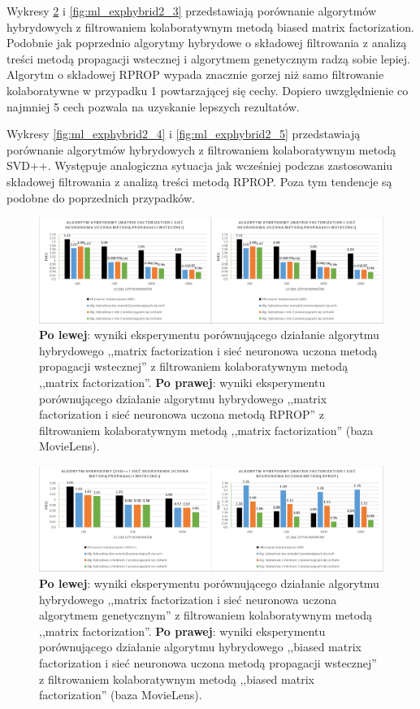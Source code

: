 \documentclass[twoside]{iisthesis}
\begin{document}
		Wykresy \ref{fig:ml_exphybrid2_2} i \ref{fig:ml_exphybrid2_3} przedstawiają porównanie algorytmów hybrydowych z filtrowaniem kolaboratywnym metodą biased matrix factorization. Podobnie jak poprzednio algorytmy hybrydowe o składowej filtrowania z analizą treści metodą propagacji wstecznej i algorytmem genetycznym radzą sobie lepiej. Algorytm o składowej RPROP wypada znacznie gorzej niż samo filtrowanie kolaboratywne w przypadku 1 powtarzającej się cechy. Dopiero uwzględnienie co najmniej 5 cech pozwala na uzyskanie lepszych rezultatów.
		
		Wykresy \ref{fig:ml_exphybrid2_4} i \ref{fig:ml_exphybrid2_5} przedstawiają porównanie algorytmów hybrydowych z filtrowaniem kolaboratywnym metodą SVD++. Występuje analogiczna sytuacja jak wcześniej podczas zastosowaniu składowej filtrowania z analizą treści metodą RPROP. Poza tym tendencje są podobne do poprzednich przypadków.
		
		\begin{figure}
			\centering
			\includegraphics[width=1\textwidth]{ml_exphybrid2_1}			
			\caption{\textbf{Po lewej}: wyniki eksperymentu porównującego działanie algorytmu hybrydowego ,,matrix factorization i sieć neuronowa uczona metodą propagacji wstecznej'' z filtrowaniem kolaboratywnym metodą ,,matrix factorization''. \textbf{Po prawej}: wyniki eksperymentu porównującego działanie algorytmu hybrydowego ,,matrix factorization i sieć neuronowa uczona metodą RPROP'' z filtrowaniem kolaboratywnym metodą ,,matrix factorization'' (baza MovieLens).}
			\label{fig:ml_exphybrid2_1}
		\end{figure}
		
		\begin{figure}
			\centering
			\includegraphics[width=1\textwidth]{ml_exphybrid2_2}			
			\caption{\textbf{Po lewej}: wyniki eksperymentu porównującego działanie algorytmu hybrydowego ,,matrix factorization i sieć neuronowa uczona algorytmem genetycznym'' z filtrowaniem kolaboratywnym metodą ,,matrix factorization''. \textbf{Po prawej}: wyniki eksperymentu porównującego działanie algorytmu hybrydowego ,,biased matrix factorization i sieć neuronowa uczona metodą propagacji wstecznej'' z filtrowaniem kolaboratywnym metodą ,,biased matrix factorization'' (baza MovieLens).}
			\label{fig:ml_exphybrid2_2}
		\end{figure}
		
\end{document}
